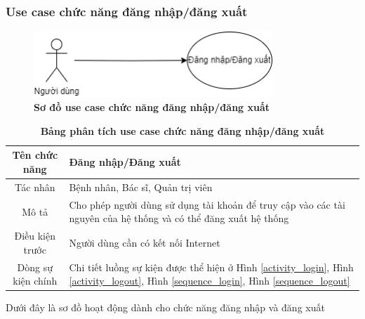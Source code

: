 \subsubsection{Use case chức năng đăng nhập/đăng xuất }
  \begin{figure}[H]
    \centering
    \includegraphics[width=9cm,height=2.5cm]{Images/use_case/use_case_login.png}
    \caption[Sơ đồ use case chức năng đăng nhập/đăng xuất]{\bfseries \fontsize{12pt}{0pt}
    \selectfont Sơ đồ use case chức năng đăng nhập/đăng xuất}
    \label{use_case_login_logout} %
  \end{figure}

  \begin{table}[H]
    \caption{\bfseries \fontsize{12pt}{0pt}\selectfont Bảng phân tích use case chức năng đăng nhập/đăng xuất}
    \centering
    \begin{tabularx}{0.9\textwidth}{|c|X|}
      \hline
      \textbf{Tên chức năng} & \textbf{Đăng nhập/Đăng xuất} \\
      \hline
      Tác nhân & Bệnh nhân, Bác sĩ, Quản trị viên \\
      \hline
      Mô tả & Cho phép người dùng sử dụng tài khoản để truy cập vào các tài nguyên của hệ thống và có thể đăng xuất hệ thống
       \\
      \hline
      Điều kiện trước & Người dùng cần có kết nối Internet \\
      \hline
      Dòng sự kiện chính & 
        Chi tiết luồng sự kiện được thể hiện ở Hình \ref{activity_login}, Hình \ref{activity_logout},  
        Hình \ref{sequence_login}, Hình \ref{sequence_logout}
        \\
      \hline
    \end{tabularx}
  \end{table}
  Dưới đây là sơ đồ hoạt động dành cho chức năng đăng nhập và đăng xuất
  
